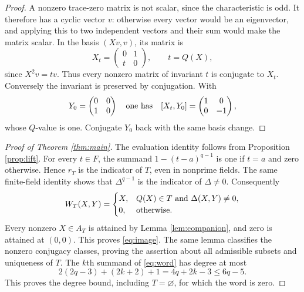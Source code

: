 \documentclass[11pt]{article}
\begin{document}
\begin{proof}
A nonzero trace-zero matrix is not scalar, since the characteristic is odd.
It therefore has a cyclic vector $v$: otherwise every vector would be an
eigenvector, and applying this to two independent vectors and their sum
would make the matrix scalar. In the basis $(Xv,v)$, its matrix is
\begin{equation}\label{eq:companion}
 X_t=\begin{pmatrix}0&1\\t&0\end{pmatrix},\qquad t=Q(X),
\end{equation}
since $X^2v=tv$. Thus every nonzero matrix of invariant $t$ is conjugate
to $X_t$. Conversely the invariant is preserved by conjugation.
With
\[
 Y_0=\begin{pmatrix}0&0\\1&0\end{pmatrix}
 \quad\hbox{one has}\quad
 [X_t,Y_0]=\begin{pmatrix}1&0\\0&-1\end{pmatrix},
\]
whose $Q$-value is one. Conjugate $Y_0$ back with the same basis change.
\end{proof}

\begin{proof}[Proof of Theorem \ref{thm:main}]
The evaluation identity follows from Proposition \ref{prop:lift}.
For every $t\in F$, the summand $1-(t-a)^{q-1}$ is one if $t=a$ and zero
otherwise. Hence $r_T$ is the indicator of $T$, even in nonprime fields.
The same finite-field identity shows that $\Delta^{q-1}$ is the indicator
of $\Delta\neq0$. Consequently
\begin{equation}\label{eq:selection}
 W_T(X,Y)=
 \begin{cases}
 X,&Q(X)\in T\ \hbox{and}\ \Delta(X,Y)\neq0,\\
 0,&\hbox{otherwise}.
 \end{cases}
\end{equation}
Every nonzero $X\in A_T$ is attained by Lemma \ref{lem:companion}, and
zero is attained at $(0,0)$. This proves \eqref{eq:image}.
The same lemma classifies the nonzero conjugacy classes, proving the
assertion about all admissible subsets and uniqueness of $T$.
The $k$th summand of \eqref{eq:word} has degree at most
\[
 2(2q-3)+(2k+2)+1=4q+2k-3\leq6q-5.
\]
This proves the degree bound, including $T=\varnothing$, for which the
word is zero.
\end{proof}
\end{document}
